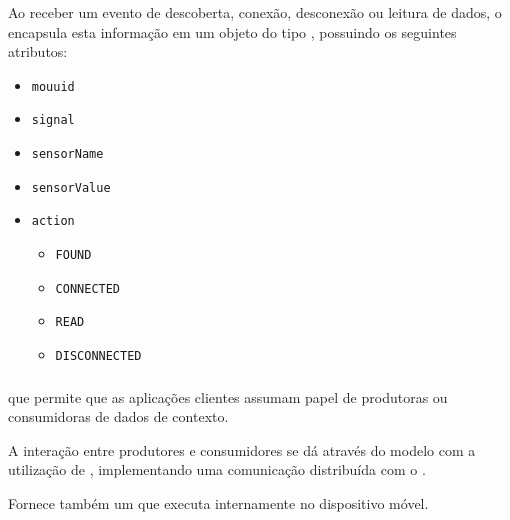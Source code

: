 \documentclass[aspectratio=169]{beamer}
\begin{document}
\begin{frame}
	\frametitle{\sensordata}
	Ao receber um evento de descoberta, conexão, desconexão ou leitura de dados, o \stwopa encapsula esta informação em um objeto do tipo \sensordata, possuindo os seguintes atributos:
	\begin{itemize}
		\item \texttt{mouuid}

		\item \texttt{signal}

		\item \texttt{sensorName}

		\item \texttt{sensorValue}
			
		\item \texttt{action}
		\begin{itemize}

			\item \texttt{FOUND}

			\item \texttt{CONNECTED}

			\item \texttt{READ}

			\item \texttt{DISCONNECTED}

		\end{itemize}
	\end{itemize}
\end{frame}

\begin{frame}
	\frametitle{\cddl}
	\Middleware \iomt que permite que as aplicações clientes assumam papel de produtoras ou consumidoras de dados de contexto.
	
	\bigskip
	A interação entre produtores e consumidores se dá através do modelo \pubsub com a utilização de \brokers, implementando uma comunicação distribuída com o \mqtt.
	\bigskip
	
	Fornece também um \ubroker que executa internamente no dispositivo móvel.
\end{frame}
\end{document}
